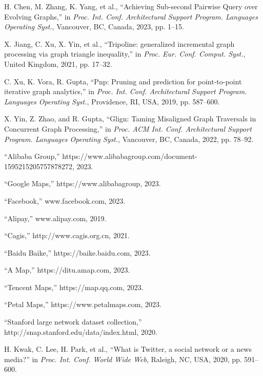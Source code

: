 \documentclass[lettersize,journal]{IEEEtran} %
\begin{document}
\begin{thebibliography}{100}
  
  
  H. Chen, M. Zhang, K. Yang, et al., ``Achieving Sub-second Pairwise Query over Evolving Graphs,'' in \textit{Proc. Int. Conf. Architectural Support Program. Languages Operating Syst.}, Vancouver, BC, Canada, 2023, pp. 1--15.
  
  X. Jiang, C. Xu, X. Yin, et al., ``Tripoline: generalized incremental graph processing via graph triangle inequality,'' in \textit{Proc. Eur. Conf. Comput. Syst.}, United Kingdom, 2021, pp. 17--32.
  
  C. Xu, K. Vora, R. Gupta, ``Pnp: Pruning and prediction for point-to-point iterative graph analytics,'' in \textit{Proc. Int. Conf. Architectural Support Program. Languages Operating Syst.}, Providence, RI, USA, 2019, pp. 587--600.
  
  X. Yin, Z. Zhao, and R. Gupta, ``Glign: Taming Misaligned Graph Traversals in Concurrent Graph Processing,'' in \textit{Proc. ACM Int. Conf. Architectural Support Program. Languages Operating Syst.}, Vancouver, BC, Canada, 2022, pp. 78--92.

  ``Alibaba Group,'' https://www.alibabagroup.com/document-1595215205757878272, 2023.
  
  
  ``Google Maps,'' https://www.alibabagroup, 2023.
  
  ``Facebook,'' www.facebook.com, 2023.
  
  ``Alipay,'' www.alipay.com, 2019.
  
  ``Cagis,'' http://www.cagis.org.cn, 2021.
  
  ``Baidu Baike,'' https://baike.baidu.com, 2023.
  
  ``A Map,'' https://ditu.amap.com, 2023.
  
  ``Tencent Maps,'' https://map.qq.com, 2023.
  
  ``Petal Maps,'' https://www.petalmaps.com, 2023.
  
  ``Stanford large network dataset collection,'' http://snap.stanford.edu/data/index.html, 2020.
  
  H. Kwak, C. Lee, H. Park, et al., ``What is Twitter, a social network or a news media?'' in \textit{Proc. Int. Conf. World Wide Web}, Raleigh, NC, USA, 2020, pp. 591--600.
  

\end{thebibliography}
\end{document}
